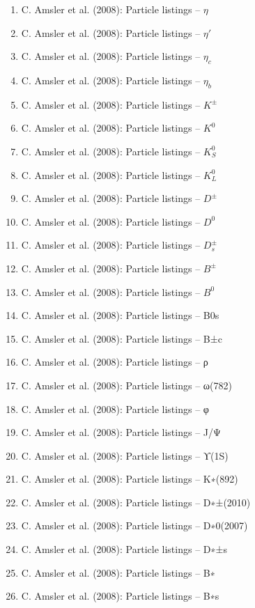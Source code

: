 \begin{enumerate}
\item C. Amsler et al. (2008): Particle listings – $\eta$
\item C. Amsler et al. (2008): Particle listings – $\eta'$
\item C. Amsler et al. (2008): Particle listings – $\eta_c$
\item C. Amsler et al. (2008): Particle listings – $\eta_b$
\item C. Amsler et al. (2008): Particle listings – $K^\pm$
\item C. Amsler et al. (2008): Particle listings – $K^0$
\item C. Amsler et al. (2008): Particle listings – $K^0_S$
\item C. Amsler et al. (2008): Particle listings – $K^0_L$
\item C. Amsler et al. (2008): Particle listings – $D^\pm$
\item C. Amsler et al. (2008): Particle listings – $D^0$
\item C. Amsler et al. (2008): Particle listings – $D^\pm_s$
\item C. Amsler et al. (2008): Particle listings – $B^\pm$
\item C. Amsler et al. (2008): Particle listings – $B^0$
\item C. Amsler et al. (2008): Particle listings – B0s
\item C. Amsler et al. (2008): Particle listings – B±c
\item C. Amsler et al. (2008): Particle listings – ρ
\item C. Amsler et al. (2008): Particle listings – ω(782)
\item C. Amsler et al. (2008): Particle listings – φ
\item C. Amsler et al. (2008): Particle listings – J/Ψ
\item C. Amsler et al. (2008): Particle listings – ϒ(1S)
\item C. Amsler et al. (2008): Particle listings – K∗(892)
\item C. Amsler et al. (2008): Particle listings – D∗±(2010)
\item C. Amsler et al. (2008): Particle listings – D∗0(2007)
\item C. Amsler et al. (2008): Particle listings – D∗±s
\item C. Amsler et al. (2008): Particle listings – B∗
\item C. Amsler et al. (2008): Particle listings – B∗s
\end{enumerate}